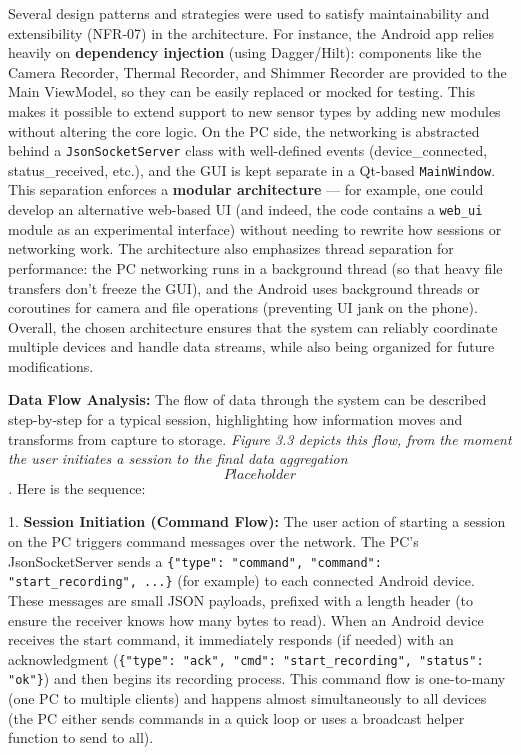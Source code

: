 \documentclass[11pt,a4paper]{report}
\begin{document}
Several design patterns and strategies were used to satisfy
maintainability and extensibility (NFR-07) in the architecture. For
instance, the Android app relies heavily on \textbf{dependency injection}
(using Dagger/Hilt): components like the Camera Recorder, Thermal
Recorder, and Shimmer Recorder are provided to the Main ViewModel, so
they can be easily replaced or mocked for
testing.
This makes it possible to extend support to new sensor types by adding
new modules without altering the core logic. On the PC side, the
networking is abstracted behind a \texttt{JsonSocketServer} class with
well-defined events (device\_connected, status\_received, etc.), and the
GUI is kept separate in a Qt-based \texttt{MainWindow}. This separation
enforces a \textbf{modular architecture} --- for example, one could develop an
alternative web-based UI (and indeed, the code contains a \texttt{web\_ui}
module as an experimental interface) without needing to rewrite how
sessions or networking work. The architecture also emphasizes thread
separation for performance: the PC networking runs in a background
thread (so that heavy file transfers don't freeze the GUI), and the
Android uses background threads or coroutines for camera and file
operations (preventing UI jank on the phone). Overall, the chosen
architecture ensures that the system can reliably coordinate multiple
devices and handle data streams, while also being organized for future
modifications.

\textbf{Data Flow Analysis:} The flow of data through the system can be
described step-by-step for a typical session, highlighting how
information moves and transforms from capture to storage. \textit{Figure 3.3
depicts this flow, from the moment the user initiates a session to the
final data aggregation \[Placeholder\].} Here is the sequence:

1.  \textbf{Session Initiation (Command Flow):} The user action of starting a
    session on the PC triggers command messages over the network. The
    PC's JsonSocketServer sends a
    \texttt{\{"type": "command", "command": "start\_recording", ...\}} (for
    example) to each connected Android
    device.
    These messages are small JSON payloads, prefixed with a length
    header (to ensure the receiver knows how many bytes to
    read).
    When an Android device receives the start command, it immediately
    responds (if needed) with an acknowledgment
    (\texttt{\{"type": "ack", "cmd": "start\_recording", "status": "ok"\}})
    and then begins its recording process. This command flow is
    one-to-many (one PC to multiple clients) and happens almost
    simultaneously to all devices (the PC either sends commands in a
    quick loop or uses a broadcast helper function to send to
    all).
\end{document}
